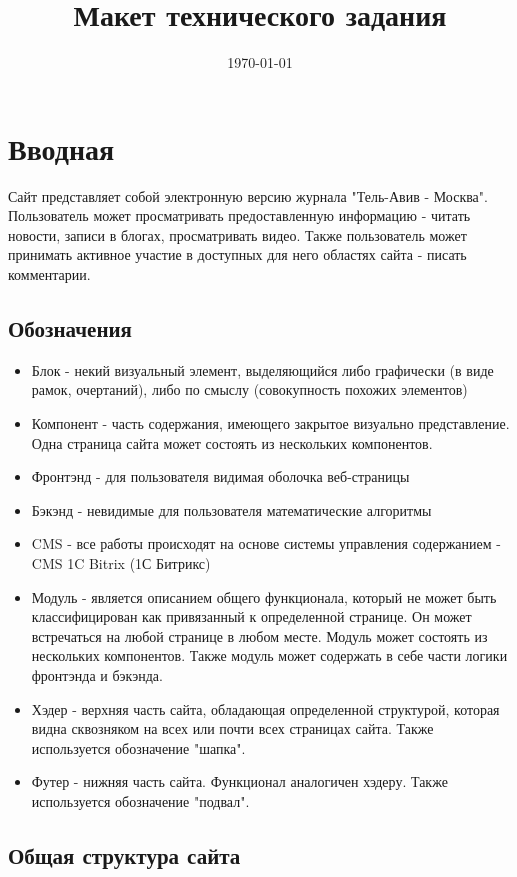 \documentclass[DIV=calc, paper=a4, fontsize=11pt]{scrartcl} %
\title{Макет технического задания} %
\date{\today} %
\begin{document}
\maketitle

\section{Вводная}
Сайт представляет собой электронную версию журнала "Тель-Авив - Москва". Пользователь может просматривать предоставленную информацию - читать новости, записи в блогах, просматривать видео. Также пользователь может принимать активное участие в доступных для него областях сайта - писать комментарии.

\subsection{Обозначения}

\begin{itemize}
\item Блок - некий визуальный элемент, выделяющийся либо графически (в виде рамок, очертаний), либо по смыслу (совокупность похожих элементов)
\item Компонент - часть содержания, имеющего закрытое визуально представление. Одна страница сайта может состоять из нескольких компонентов.
\item Фронтэнд - для пользователя видимая оболочка веб-страницы
\item Бэкэнд - невидимые для пользователя математические алгоритмы
\item CMS - все работы происходят на основе системы управления содержанием - CMS 1C Bitrix (1С Битрикс)
\item Модуль - является описанием общего функционала, который не может быть классифицирован как привязанный к определенной странице. Он может встречаться на любой странице в любом месте. Модуль может состоять из нескольких компонентов. Также модуль может содержать в себе части логики фронтэнда и бэкэнда.
\item Хэдер - верхняя часть сайта, обладающая определенной структурой, которая видна сквозняком на всех или почти всех страницах сайта. Также используется обозначение "шапка".
\item Футер - нижняя часть сайта. Функционал аналогичен хэдеру. Также используется обозначение "подвал".
\end{itemize}

\subsection{Общая структура сайта}
\end{document}
